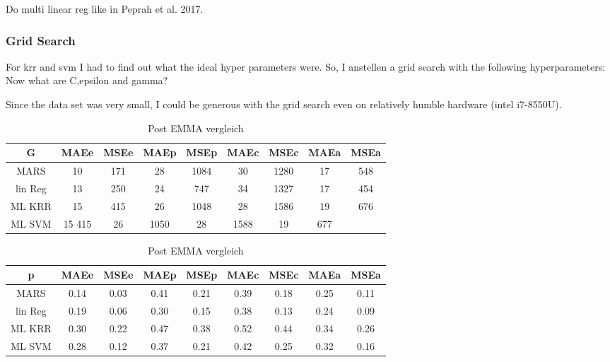 Do multi linear reg like in Peprah et al. 2017\cite{peprah2017appraisal}.


\subsubsection{Grid Search}
For \gls{krr} and {svm} I had to find out what the ideal hyper parameters were. 
So, I anstellen a grid search with the following hyperparameters: 
Now what are C,epsilon and gamma? 

Since the data set was very small, I could be generous with the grid search even on relatively humble hardware (intel i7-8550U). 

\begin{table}[htb]
	\centering
    \caption{Post EMMA vergleich}
	\label{tab:post-emma}
	\begin{tabular}{c cc cc cc cc}
    \hline\hline
    G&  MAEe&   MSEe&   MAEp&   MSEp&   MAEc&   MSEc&   MAEa& MSEa \\
    \hline
        MARS&   10& 171&    28& 1084&   30& 1280&   17& 548\\
        lin Reg&    13& 250&    24& 747&    34& 1327&   17& 454\\
        ML KRR& 15& 415&    26& 1048&   28& 1586&   19& 676\\
        ML SVM& 15  415&    26& 1050&   28& 1588&   19& 677\\
    \hline\hline
	\end{tabular}
	\begin{tabular}{c cc cc cc cc}
    \hline\hline
    p&  MAEe&   MSEe&   MAEp&   MSEp&   MAEc&   MSEc&   MAEa& MSEa \\
    \hline
        MARS&   0.14&   0.03&   0.41&   0.21&   0.39&   0.18&   0.25&   0.11\\
        lin Reg&    0.19&   0.06&   0.30&   0.15&   0.38&   0.13&   0.24&   0.09\\
        ML KRR& 0.30&   0.22&   0.47&   0.38&   0.52&   0.44&   0.34&   0.26\\
        ML SVM& 0.28&   0.12&   0.37&   0.21&   0.42&   0.25&   0.32&   0.16\\
    \hline\hline
	\end{tabular}
\end{table}
    

